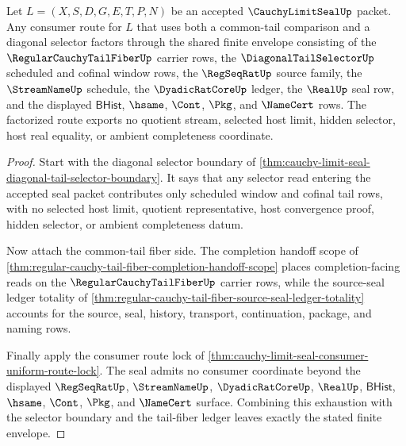 \begin{theorem}
\label{thm:cauchy-limit-seal-tail-fiber-selector-factorization}
Let $L=(X,S,D,G,E,T,P,N)$ be an accepted $\CauchyLimitSealUp$ packet. Any consumer route for $L$ that uses both a common-tail comparison and a diagonal selector factors through the shared finite envelope consisting of the $\RegularCauchyTailFiberUp$ carrier rows, the $\DiagonalTailSelectorUp$ scheduled and cofinal window rows, the $\RegSeqRatUp$ source family, the $\StreamNameUp$ schedule, the $\DyadicRatCoreUp$ ledger, the $\RealUp$ seal row, and the displayed $\mathsf{BHist}$, $\hsame$, $\Cont$, $\Pkg$, and $\NameCert$ rows. The factorized route exports no quotient stream, selected host limit, hidden selector, host real equality, or ambient completeness coordinate.
\end{theorem}
\begin{proof}
Start with the diagonal selector boundary of \autoref{thm:cauchy-limit-seal-diagonal-tail-selector-boundary}. It says that any selector read entering the accepted seal packet contributes only scheduled window and cofinal tail rows, with no selected host limit, quotient representative, host convergence proof, hidden selector, or ambient completeness datum.

Now attach the common-tail fiber side. The completion handoff scope of \autoref{thm:regular-cauchy-tail-fiber-completion-handoff-scope} places completion-facing reads on the $\RegularCauchyTailFiberUp$ carrier rows, while the source-seal ledger totality of \autoref{thm:regular-cauchy-tail-fiber-source-seal-ledger-totality} accounts for the source, seal, history, transport, continuation, package, and naming rows.

Finally apply the consumer route lock of \autoref{thm:cauchy-limit-seal-consumer-uniform-route-lock}. The seal admits no consumer coordinate beyond the displayed $\RegSeqRatUp$, $\StreamNameUp$, $\DyadicRatCoreUp$, $\RealUp$, $\mathsf{BHist}$, $\hsame$, $\Cont$, $\Pkg$, and $\NameCert$ surface. Combining this exhaustion with the selector boundary and the tail-fiber ledger leaves exactly the stated finite envelope.
\end{proof}

